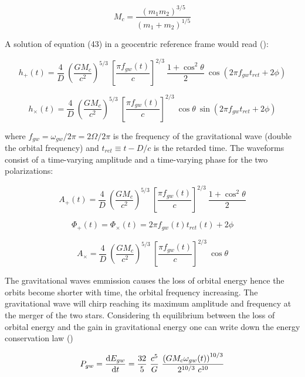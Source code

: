 \documentclass[epsf]{article}
\begin{document}
\begin{equation}
 M_c= \frac{{(m_1m_2)}^{3/5}}{{(m_1+m_2)}^{1/5}}
\label{eqn:chirpmass}
\end{equation}


A solution of equation (43) in a geocentric reference frame would read (\cite{maggiore}):

\begin{equation}
\boxed{h_+(t) = \frac{4}{D} ~\left({\frac{GM_c}{c^2}}\right)^{5/3}~\left[{\frac{\pi f_{gw}(t)}{c}}\right]^{2/3}~ \frac{1+\cos^2 \theta}{2}~ \cos(2 \pi f_{gw}t_{ret}+2 \phi)}
\label{eqn:hplus}
\end{equation}

\begin{equation}
\boxed{h_{\times}(t) = \frac{4}{D} ~\left({\frac{GM_c}{c^2}}\right)^{5/3}~\left[{\frac{\pi f_{gw}(t)}{c}}\right]^{2/3}~ \cos \theta~\sin (2 \pi f_{gw}t_{ret}+2 \phi)}
\label{eqn:hcross}
\end{equation}

where $f_{gw}=\omega_{gw}/2 \pi=2\Omega/2 \pi$ is the frequency of the gravitational wave (double the orbital frequency) and $t_{ret} \equiv t-D/c$ is the retarded time. The waveforms consist of a time-varying amplitude and a time-varying phase for the two polarizations:

\begin{equation}
A_+ (t) = \frac{4}{D} ~\left({\frac{GM_c}{c^2}}\right)^{5/3}~\left[{\frac{\pi f_{gw}(t)}{c}}\right]^{2/3}~ \frac{1+\cos^2 \theta}{2} 
\end{equation}

\begin{equation}
\Phi_+(t) = \Phi_{\times}(t) = 2 \pi f_{gw}(t)t_{ret}(t)+2 \phi
\end{equation}

\begin{equation}
A_{\times} = \frac{4}{D} ~\left({\frac{GM_c}{c^2}}\right)^{5/3}~\left[{\frac{\pi f_{gw}(t)}{c}}\right]^{2/3}~ \cos \theta
\end{equation}

The gravitational waves emmission causes the loss of orbital energy hence the orbits become shorter with time, the orbital frequency increasing. The gravitational wave will chirp reaching its maximum amplitude and frequency at the merger of the two stars. Considering th equilibrium between the loss of orbital energy and the gain in gravitational energy one can write down the energy conservation law (\cite{maggiore})

\begin{equation}
P_{gw} = \frac {{\rm d}E_{gw}}{{\rm d}t} =  \frac {32}{5}~ \frac {c^5}{G}~\frac{{(GM_c \omega_{gw}(t))}^{10/3}}{2^{10/3}~c^{10}}
\end{equation}
\end{document}

